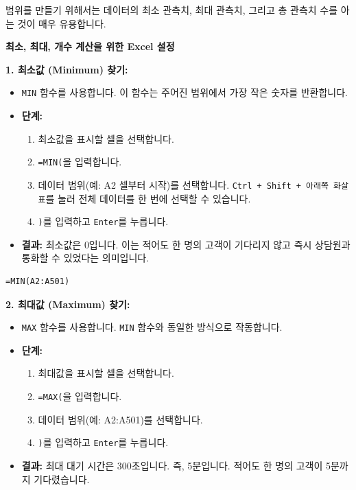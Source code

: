 \documentclass[11pt,a4paper]{book}
\providecommand{\captionof}[2]{\textbf{#2}}
\theoremstyle{definition}
\begin{document}
\begin{tcolorbox}[title={최소값, 최대값, 개수 찾기 (Finding Min, Max, Count)}]
범위를 만들기 위해서는 데이터의 최소 관측치, 최대 관측치, 그리고 총 관측치 수를 아는 것이 매우 유용합니다.

\begin{center}
\captionof{figure}{최소, 최대, 개수 계산을 위한 Excel 설정}
\label{fig:excel_min_max_count_setup}
\end{center}

\textbf{1. 최소값 (Minimum) 찾기:}
\begin{itemize}
    \item \texttt{MIN} 함수를 사용합니다. 이 함수는 주어진 범위에서 가장 작은 숫자를 반환합니다.
    \item \textbf{단계:}
    \begin{enumerate}
        \item 최소값을 표시할 셀을 선택합니다.
        \item \texttt{=MIN(}을 입력합니다.
        \item 데이터 범위(예: A2 셀부터 시작)를 선택합니다. \texttt{Ctrl + Shift + 아래쪽 화살표}를 눌러 전체 데이터를 한 번에 선택할 수 있습니다.
        \item \texttt{)}를 입력하고 \texttt{Enter}를 누릅니다.
    \end{enumerate}
    \item \textbf{결과:} 최소값은 0입니다. 이는 적어도 한 명의 고객이 기다리지 않고 즉시 상담원과 통화할 수 있었다는 의미입니다.
\end{itemize}

\begin{lstlisting}[caption={Excel MIN 함수 사용 예시}, label={lst:excel_min}]
=MIN(A2:A501)
\end{lstlisting}

\textbf{2. 최대값 (Maximum) 찾기:}
\begin{itemize}
    \item \texttt{MAX} 함수를 사용합니다. \texttt{MIN} 함수와 동일한 방식으로 작동합니다.
    \item \textbf{단계:}
    \begin{enumerate}
        \item 최대값을 표시할 셀을 선택합니다.
        \item \texttt{=MAX(}을 입력합니다.
        \item 데이터 범위(예: A2:A501)를 선택합니다.
        \item \texttt{)}를 입력하고 \texttt{Enter}를 누릅니다.
    \end{enumerate}
    \item \textbf{결과:} 최대 대기 시간은 300초입니다. 즉, 5분입니다. 적어도 한 명의 고객이 5분까지 기다렸습니다.
\end{itemize}


\end{tcolorbox}
\end{document}
